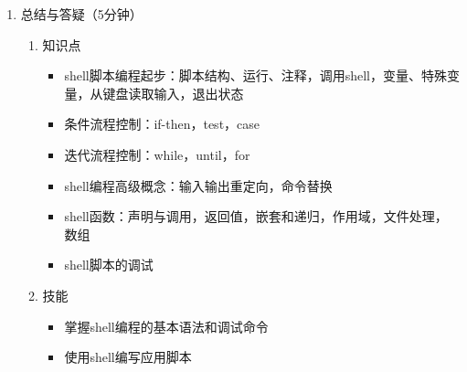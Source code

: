 \documentclass{TIJMUjiaoanLL}
\begin{document}
\begin{enumerate}
\otherTail
\newpage
\otherHeader


  \item 总结与答疑（5分钟）
    \begin{enumerate}
      \item 知识点
	\begin{itemize}
          \item shell脚本编程起步：脚本结构、运行、注释，调用shell，变量、特殊变量，从键盘读取输入，退出状态
          \item 条件流程控制：if-then，test，case
          \item 迭代流程控制：while，until，for
          \item shell编程高级概念：输入输出重定向，命令替换
          \item shell函数：声明与调用，返回值，嵌套和递归，作用域，文件处理，数组
          \item shell脚本的调试
	\end{itemize}
      \item 技能
	\begin{itemize}
          \item 掌握shell编程的基本语法和调试命令
          \item 使用shell编写应用脚本
	\end{itemize}
    \end{enumerate}

\end{enumerate}

\otherTail
\end{document}
